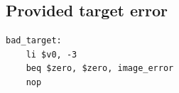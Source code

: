 \subsection{Provided target error}
\begin{verbatim}
bad_target:
    li $v0, -3
    beq $zero, $zero, image_error
    nop
\end{verbatim}
